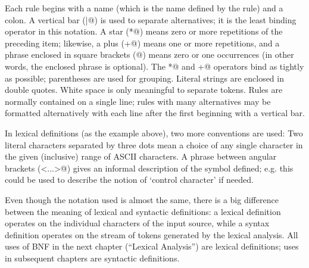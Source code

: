 Each rule begins with a name (which is the name defined by the rule)
and a colon.  A vertical bar (\verb@|@) is used to separate
alternatives; it is the least binding operator in this notation.  A
star (\verb@*@) means zero or more repetitions of the preceding item;
likewise, a plus (\verb@+@) means one or more repetitions, and a
phrase enclosed in square brackets (\verb@[ ]@) means zero or one
occurrences (in other words, the enclosed phrase is optional).  The
\verb@*@ and \verb@+@ operators bind as tightly as possible;
parentheses are used for grouping.  Literal strings are enclosed in
double quotes.  White space is only meaningful to separate tokens.
Rules are normally contained on a single line; rules with many
alternatives may be formatted alternatively with each line after the
first beginning with a vertical bar.

In lexical definitions (as the example above), two more conventions
are used: Two literal characters separated by three dots mean a choice
of any single character in the given (inclusive) range of ASCII
characters.  A phrase between angular brackets (\verb@<...>@) gives an
informal description of the symbol defined; e.g. this could be used
to describe the notion of `control character' if needed.

Even though the notation used is almost the same, there is a big
difference between the meaning of lexical and syntactic definitions:
a lexical definition operates on the individual characters of the
input source, while a syntax definition operates on the stream of
tokens generated by the lexical analysis.  All uses of BNF in the next
chapter (``Lexical Analysis'') are lexical definitions; uses in
subsequent chapters are syntactic definitions.
